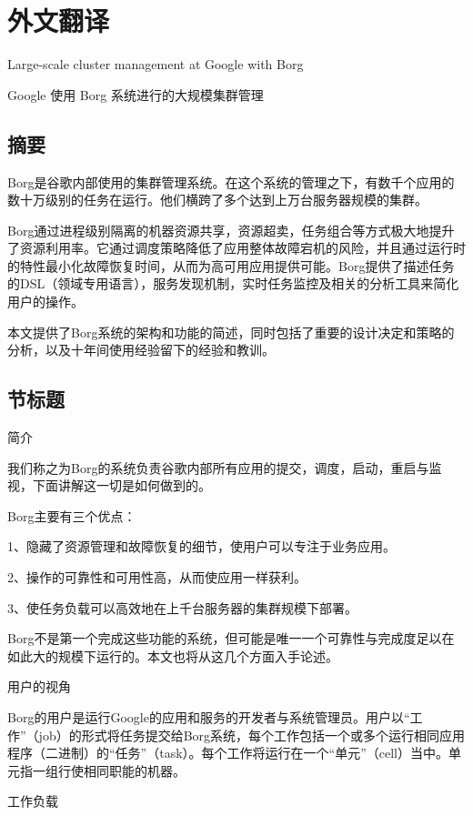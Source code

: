 \cleardoublepage
\chapter{外文翻译}

Large-scale cluster management at Google with Borg

Google 使用 Borg 系统进行的大规模集群管理

\section*{摘要}

Borg是谷歌内部使用的集群管理系统。在这个系统的管理之下，有数千个应用的数十万级别的任务在运行。他们横跨了多个达到上万台服务器规模的集群。

Borg通过进程级别隔离的机器资源共享，资源超卖，任务组合等方式极大地提升了资源利用率。它通过调度策略降低了应用整体故障宕机的风险，并且通过运行时的特性最小化故障恢复时间，从而为高可用应用提供可能。Borg提供了描述任务的DSL（领域专用语言），服务发现机制，实时任务监控及相关的分析工具来简化用户的操作。

本文提供了Borg系统的架构和功能的简述，同时包括了重要的设计决定和策略的分析，以及十年间使用经验留下的经验和教训。

\section{节标题}

简介

我们称之为Borg的系统负责谷歌内部所有应用的提交，调度，启动，重启与监视，下面讲解这一切是如何做到的。

Borg主要有三个优点：

1、隐藏了资源管理和故障恢复的细节，使用户可以专注于业务应用。

2、操作的可靠性和可用性高，从而使应用一样获利。

3、使任务负载可以高效地在上千台服务器的集群规模下部署。

Borg不是第一个完成这些功能的系统，但可能是唯一一个可靠性与完成度足以在如此大的规模下运行的。本文也将从这几个方面入手论述。

用户的视角

Borg的用户是运行Google的应用和服务的开发者与系统管理员。用户以“工作”（job）的形式将任务提交给Borg系统，每个工作包括一个或多个运行相同应用程序（二进制）的“任务”（task）。每个工作将运行在一个“单元”（cell）当中。单元指一组行使相同职能的机器。

工作负载

